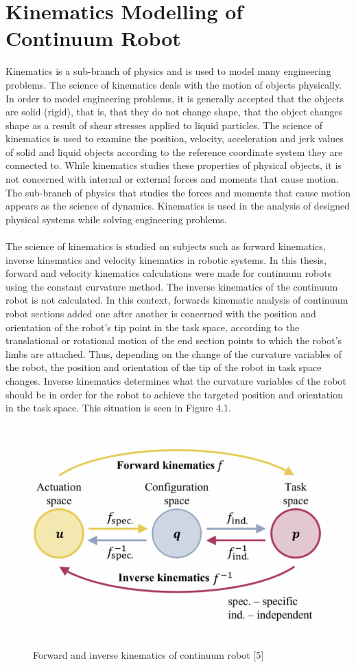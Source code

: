 \documentclass[12pt,twoside,a4]{mwbk}
\begin{document}
\chapter{Kinematics Modelling of Continuum Robot}
Kinematics is a sub-branch of physics and is used to model many engineering problems. The science of kinematics deals with the motion of objects physically. In order to model engineering problems, it is generally accepted that the objects are solid (rigid), that is, that they do not change shape, that the object changes shape as a result of shear stresses applied to liquid particles. The science of kinematics is used to examine the position, velocity, acceleration and jerk values of solid and liquid objects according to the reference coordinate system they are connected to. While kinematics studies these properties of physical objects, it is not concerned with internal or external forces and moments that cause motion. The sub-branch of physics that studies the forces and moments that cause motion appears as the science of dynamics. Kinematics is used in the analysis of designed physical systems while solving engineering problems.
\\ \\
The science of kinematics is studied on subjects such as forward kinematics, inverse kinematics and velocity kinematics in robotic systems. In this thesis, forward and velocity kinematics calculations were made for continuum robots using the constant curvature method. The inverse kinematics of the continuum robot is not calculated. In this context, forwards kinematic analysis of continuum robot sections added one after another is concerned with the position and orientation of the robot's tip point in the task space, according to the translational or rotational motion of the end section points to which the robot's limbs are attached. Thus, depending on the change of the curvature variables of the robot, the position and orientation of the tip of the robot in task space changes. Inverse kinematics determines what the curvature variables of the robot should be in order for the robot to achieve the targeted position and orientation in the task space. This situation is seen in Figure 4.1.
\newpage
\begin{figure}[h]
    \centering
    \includegraphics[width=13.4cm, height=8.5cm]{forward-inverse.png}
    \caption{Forward and inverse kinematics of continuum robot [5]}
\end{figure}
\end{document}
